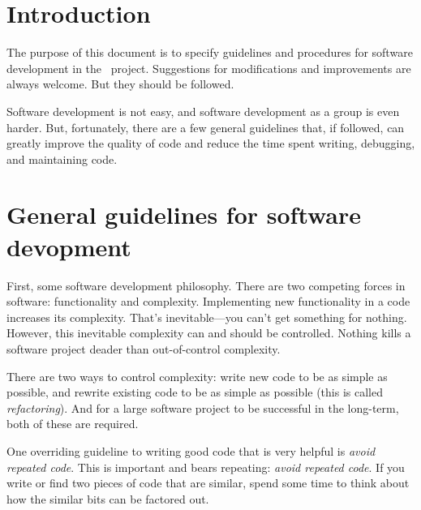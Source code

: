 \documentclass{article}
\begin{document}

\tableofcontents

\section{Introduction} \label{s:intro}

The purpose of this document is to specify guidelines and procedures
for software development in the \cello\ project.  Suggestions for
modifications and improvements are always welcome.  But they should be
followed.

Software development is not easy, and software development as a group
is even harder.  But, fortunately, there are a few general guidelines
that, if followed, can greatly improve the quality of code and reduce
the time spent writing, debugging, and maintaining code.

\section{General guidelines for software devopment}

First, some software development philosophy.  There are two competing
forces in software: functionality and complexity.  Implementing new
functionality in a code increases its complexity.  That's
inevitable---you can't get something for nothing.  However, this
inevitable complexity can and should be controlled.  Nothing kills a
software project deader than out-of-control complexity.

There are two ways to control complexity: write new code to be as
simple as possible, and rewrite existing code to be as simple as
possible (this is called \textit{refactoring}).  And for a large
software project to be successful in the long-term, both of these are
required.

One overriding guideline to writing good code that is very helpful is
\textit{avoid repeated code}.  This is important and bears repeating:
\textit{avoid repeated code}.  If you write or find two pieces of
code that are similar, spend some time to think about how the similar
bits can be factored out.  
\end{document}
